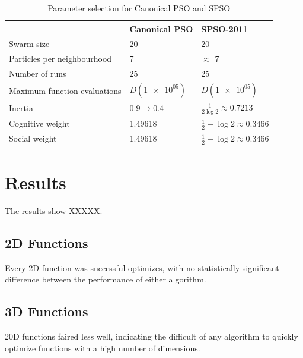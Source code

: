 \documentclass{csfourzero}
\begin{document}
\begin{table}
\centering
  \begin{tabular}{lll}
  \hline
                                & Canonical PSO         & SPSO-2011 \\ \hline
  Swarm size                    & 20                    & 20 \\
  Particles per neighbourhood   & 7                     & $\approx$ 7 \\
  Number of runs                & 25                    & 25 \\
  Maximum function evaluations  & $D(\num{1e+05})$      & $D(\num{1e+05})$ \\
  Inertia                       & $0.9 \rightarrow 0.4$ & $\frac{1}{2\log{2}} \approx 0.7213$ \\
  Cognitive weight              & 1.49618               & $\frac{1}{2} + \log{2} \approx 0.3466$ \\
  Social weight                 & 1.49618               & $\frac{1}{2} + \log{2} \approx 0.3466$ \\
  \end{tabular}
  \caption{Parameter selection for Canonical PSO and SPSO}
  \label{tab:parameters}
\end{table}


\section{Results}

The results show XXXXX.

\subsection{2D Functions}

Every 2D function was successful optimizes, with no statistically significant
difference between the performance of either algorithm.

\subsection{3D Functions}

20D functions faired less well, indicating the difficult of any algorithm to
quickly optimize functions with a high number of dimensions.
\end{document}
